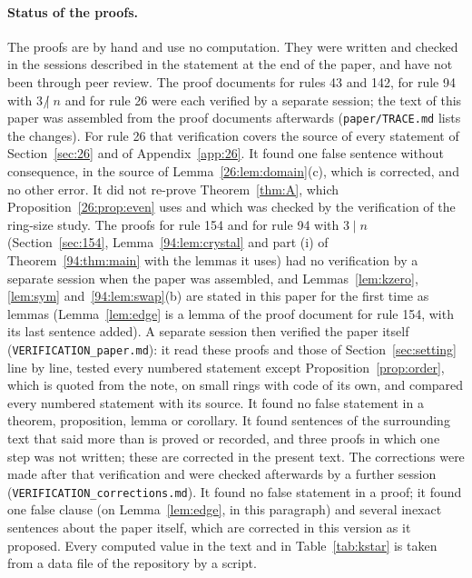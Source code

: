 \documentclass[10pt,a4paper]{article}
\newcommand{\ndiv}{\mathrel{\not|}}           %
\begin{document}
\paragraph{Status of the proofs.}
The proofs are by hand and use no computation. They were written and checked in the sessions described in the
statement at the end of the paper, and have not been through peer review. The proof documents for rules 43
and 142, for rule 94 with $3\ndiv n$ and for rule 26 were each verified by a separate session; the text of this
paper was assembled from the proof documents afterwards (\texttt{paper/TRACE.md} lists the changes). For rule 26 that
verification covers the source of every statement of Section~\ref{sec:26} and of Appendix~\ref{app:26}. It found one
false sentence without consequence, in the source of Lemma~\ref{26:lem:domain}(c), which is corrected, and no other
error. It did not re-prove Theorem~\ref{thm:A}, which Proposition~\ref{26:prop:even} uses and which was checked by
the verification of the ring-size study. The proofs for rule 154 and for rule 94 with $3\mid n$
(Section~\ref{sec:154}, Lemma~\ref{94:lem:crystal} and part (i) of Theorem~\ref{94:thm:main} with the lemmas it
uses) had no verification
by a separate session when the paper was assembled, and Lemmas~\ref{lem:kzero}, \ref{lem:sym}
and~\ref{94:lem:swap}(b) are stated in this paper for the first time as lemmas (Lemma~\ref{lem:edge} is a lemma of
the proof document for rule 154, with its last sentence added). A separate session then verified the
paper itself (\texttt{VERIFICATION\_paper.md}): it read these proofs and those of Section~\ref{sec:setting} line by
line, tested every numbered statement except Proposition~\ref{prop:order}, which is quoted from the note, on small
rings with code of its own, and compared every numbered
statement with its source. It found no false statement in a theorem, proposition, lemma or corollary. It found
sentences of the surrounding text that said more than is proved or recorded, and three proofs in which one step was
not written; these are corrected in the present text. The corrections were made after that verification and were
checked afterwards by a further session (\texttt{VERIFICATION\_corrections.md}). It found no false statement in a
proof; it found one false clause (on Lemma~\ref{lem:edge}, in this paragraph) and several inexact sentences about
the paper itself, which are corrected in this version as it proposed.
Every computed value in the text and in
Table~\ref{tab:kstar} is taken from a data file of the repository by a script.
\end{document}
